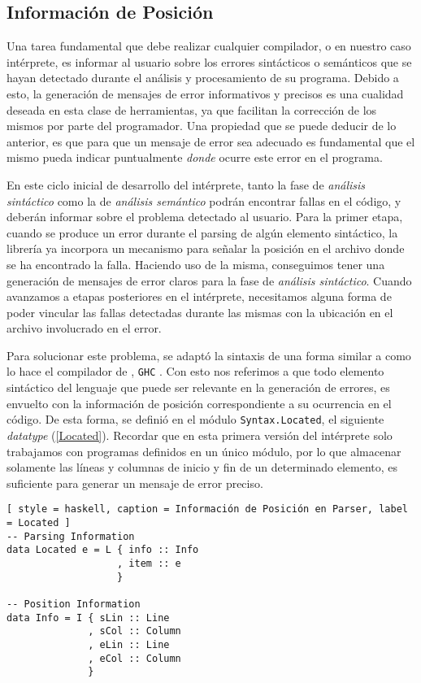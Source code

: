 \subsection{Información de Posición}

Una tarea fundamental que debe realizar cualquier compilador, o en nuestro caso intérprete, es informar al usuario sobre los errores sintácticos o semánticos que se hayan detectado durante el análisis y procesamiento de su programa.
Debido a esto, la generación de mensajes de error informativos y precisos es una cualidad deseada en esta clase de herramientas, ya que facilitan la corrección de los mismos por parte del programador.
Una propiedad que se puede deducir de lo anterior, es que para que un mensaje de error sea adecuado es fundamental que el mismo pueda indicar puntualmente \textit{donde} ocurre este error en el programa.

En este ciclo inicial de desarrollo del intérprete, tanto la fase de \textit{análisis sintáctico} como la de \textit{análisis semántico} podrán encontrar fallas en el código, y deberán informar sobre el problema detectado al usuario.
Para la primer etapa, cuando se produce un error durante el parsing de algún elemento sintáctico, la librería \Megaparsec{} ya incorpora un mecanismo para señalar la posición en el archivo donde se ha encontrado la falla.
Haciendo uso de la misma, conseguimos tener una generación de mensajes de error claros para la fase de \textit{análisis sintáctico}.
Cuando avanzamos a etapas posteriores en el intérprete, necesitamos alguna forma de poder vincular las fallas detectadas durante las mismas con la ubicación en el archivo involucrado en el error.

Para solucionar este problema, se adaptó la sintaxis de una forma similar a como lo hace el compilador de \Haskell{}, \texttt{GHC} \parencite{GHC}.
Con esto nos referimos a que todo elemento sintáctico del lenguaje que puede ser relevante en la generación de errores, es envuelto con la información de posición correspondiente a su ocurrencia en el código.
De esta forma, se definió en el módulo \lstinline[style = haskell]{Syntax.Located}, el siguiente \textit{datatype} (\ref{Located}).
Recordar que en esta primera versión del intérprete solo trabajamos con programas definidos en un único módulo, por lo que almacenar solamente las líneas y columnas de inicio y fin de un determinado elemento, es suficiente para generar un mensaje de error preciso.

\begin{lstlisting}[ style = haskell, caption = Información de Posición en Parser, label = Located ]
-- Parsing Information
data Located e = L { info :: Info
                   , item :: e
                   }

-- Position Information
data Info = I { sLin :: Line
              , sCol :: Column
              , eLin :: Line
              , eCol :: Column
              }
\end{lstlisting}

